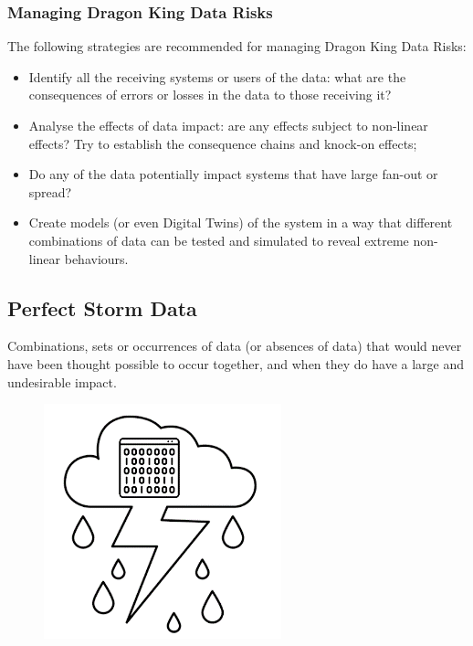 \subsubsection{Managing Dragon King Data Risks}
The following strategies are recommended for managing Dragon King Data Risks:
\begin{itemize}
\item Identify all the receiving systems or users of the data:
what are the consequences of errors or losses in the data to those receiving it?
\item Analyse the effects of data impact: are any effects subject to non-linear effects?
Try to establish the consequence chains and knock-on effects;
\item Do any of the data potentially impact systems that have large fan-out or spread?
\item Create models (or even Digital Twins) of the system in a way that different combinations
of data can be tested and simulated to reveal extreme non-linear behaviours.
\end{itemize}

\subsection{Perfect Storm Data}
 Combinations, sets or occurrences of data (or absences of data) that would never have been thought possible to occur together, and when they do have a large and undesirable impact.

\begin{figure}
  \includegraphics{images/cygStorm}
\end{figure}

